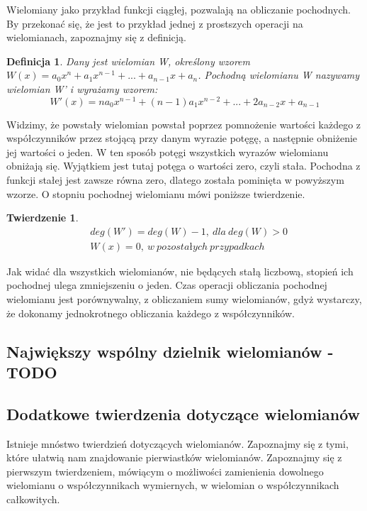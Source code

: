 \documentclass[twoside,a4paper]{book}
\newtheorem{theorem}{Twierdzenie}
\newtheorem{definition}{Definicja}
\begin{document}
Wielomiany jako przykład funkcji ciągłej, pozwalają na obliczanie pochodnych. By przekonać się, że jest to przykład jednej z prostszych operacji na wielomianach, zapoznajmy się z definicją.

\begin{definition}
	Dany jest wielomian W, określony wzorem $W(x) = a_0x^n + a_1x^{n-1} + ... + a_{n-1}x + a_n$. Pochodną wielomianu W nazywamy wielomian W' i wyrażamy wzorem:
	\begin{equation}
	W'(x) = na_0x^{n-1} + (n-1)a_1x^{n-2} + ... + 2a_{n-2}x + a_{n-1}
	\end{equation}
\end{definition}

Widzimy, że powstały wielomian powstał poprzez pomnożenie wartości każdego z współczynników przez stojącą przy danym wyrazie potęgę, a następnie obniżenie jej wartości o jeden. W ten sposób potęgi wszystkich wyrazów wielomianu obniżają się. Wyjątkiem jest tutaj potęga o wartości zero, czyli stała. Pochodna z funkcji stałej jest zawsze równa zero, dlatego została pominięta w powyższym wzorze. O stopniu pochodnej wielomianu mówi poniższe twierdzenie.

\begin{theorem}
	\begin{equation}
	\begin{split}
		&deg(W') = deg(W) - 1,\ dla\ deg(W) > 0 \\
		&W(x) = 0,\ w\ pozostałych\ przypadkach
	\end{split}
	\end{equation}
\end{theorem}

Jak widać dla wszystkich wielomianów, nie będących stałą liczbową, stopień ich pochodnej ulega zmniejszeniu o jeden. Czas operacji obliczania pochodnej wielomianu jest porównywalny, z obliczaniem sumy wielomianów, gdyż wystarczy, że dokonamy jednokrotnego obliczania każdego z współczynników.

\subsection{Największy wspólny dzielnik wielomianów - TODO}

\subsection{Dodatkowe twierdzenia dotyczące wielomianów}

Istnieje mnóstwo twierdzień dotyczących wielomianów. Zapoznajmy się z tymi, które ułatwią nam znajdowanie pierwiastków wielomianów. Zapoznajmy się z pierwszym twierdzeniem, mówiącym o możliwości zamienienia dowolnego wielomianu o współczynnikach wymiernych, w wielomian o współczynnikach całkowitych.
\end{document}
